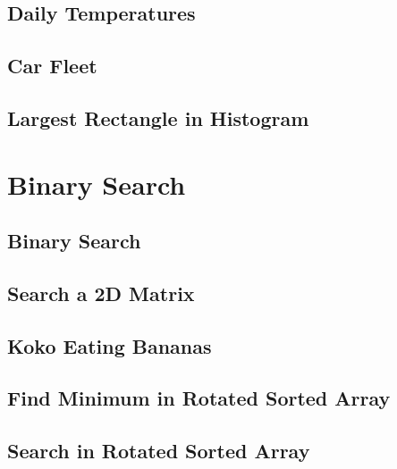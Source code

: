\documentclass[12pt,letterpaper]{book}
\theoremstyle{definition}
\theoremstyle{remark}
\begin{document}

\section{Daily Temperatures}


\section{Car Fleet}


\section{Largest Rectangle in Histogram}


\chapter{Binary Search}

\section{Binary Search}


\section{Search a 2D Matrix}


\section{Koko Eating Bananas}


\section{Find Minimum in Rotated Sorted Array}


\section{Search in Rotated Sorted Array}
\end{document}
